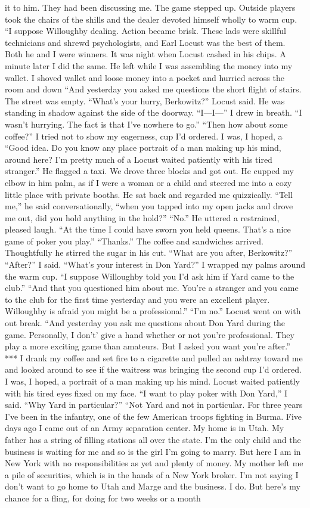\documentclass{novel}
\begin{document}
it to him. They had been discussing me. The game stepped up. Outside players took the chairs of the shills and the dealer devoted himself wholly to warm cup. “I suppose Willoughby dealing. Action became brisk. These lads were skillful technicians and shrewd psychologists, and Earl Locust was the best of them. Both he and I were winners. It was night when Locust cashed in his chips. A minute later I did the same. He left while I was assembling the money into my wallet. I shoved wallet and loose money into a pocket and hurried across the room and down “And yesterday you asked me questions the short flight of stairs. The street was empty. “What’s your hurry, Berkowitz?” Locust said. He was standing in shadow against the side of the doorway. “I—I—” I drew in breath. “I wasn’t hurrying. The fact is that I’ve nowhere to go.” “Then how about some coffee?” I tried not to show my eagerness, cup I’d ordered. I was, I hoped, a “Good idea. Do you know any place portrait of a man making up his mind, around here? I’m pretty much of a Locust waited patiently with his tired stranger.” He flagged a taxi. We drove three blocks and got out. He cupped my elbow in him palm, as if I were a woman or a child and steered me into a cozy little place with private booths. He sat back and regarded me quizzically. “Tell me,” he said conversationally, “when you tapped into my open jacks and drove me out, did you hold anything in the hold?” “No.” He uttered a restrained, pleased laugh. “At the time I could have sworn you held queens. That’s a nice game of poker you play.” “Thanks.” The coffee and sandwiches arrived. Thoughtfully he stirred the sugar in his cut. “What are you after, Berkowitz?” “After?” I said. “What’s your interest in Don Yard?” I wrapped my palms around the warm cup. “I suppose Willoughby told you I’d ask him if Yard came to the club.” “And that you questioned him about me. You’re a stranger and you came to the club for the first time yesterday and you were an excellent player. Willoughby is afraid you might be a professional.” “I’m no.” Locust went on with out break. “And yesterday you ask me questions about Don Yard during the game. Personally, I don’t’ give a hand whether or not you’re professional. They play a more exciting game than amateurs. But I asked you want you’re after.” *** I drank my coffee and set fire to a cigarette and pulled an ashtray toward me and looked around to see if the waitress was bringing the second cup I’d ordered. I was, I hoped, a portrait of a man making up his mind. Locust waited patiently with his tired eyes fixed on my face. “I want to play poker with Don Yard,” I said. “Why Yard in particular?” “Not Yard and not in particular. For three years I’ve been in the infantry, one of the few American troops fighting in Burma. Five days ago I came out of an Army separation center. My home is in Utah. My father has a string of filling stations all over the state. I’m the only child and the business is waiting for me and so is the girl I’m going to marry. But here I am in New York with no responsibilities as yet and plenty of money. My mother left me a pile of securities, which is in the hands of a New York broker. I’m not saying I don’t want to go home to Utah and Marge and the business. I do. But here’s my chance for a fling, for doing for two weeks or a month 
\end{document}
